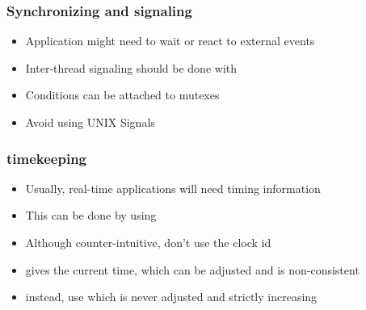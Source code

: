 \begin{frame}
	\frametitle{Synchronizing and signaling}
	\begin{itemize}
		\item Application might need to wait or react to external events
		\item Inter-thread signaling should be done with 
		\item Conditions can be attached to mutexes
		\item Avoid using UNIX Signals
	\end{itemize}
\end{frame}

\begin{frame}
	\frametitle{timekeeping}
	\begin{itemize}
		\item Usually, real-time applications will need timing information
		\item This can be done by using 
		\item Although counter-intuitive, don't use the  clock id
		\item {} gives the current time, which can be adjusted and is non-consistent
		\item instead, use  which is never adjusted and strictly increasing
	\end{itemize}
\end{frame}

